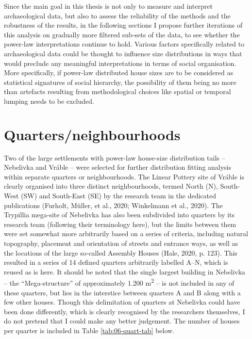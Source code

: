 \documentclass[
  12pt,
]{book}
\begin{document}
Since the main goal in this thesis is not only to measure and interpret archaeological data, but also to assess the reliability of the methods and the robustness of the results, in the following sections I propose further iterations of this analysis on gradually more filtered sub-sets of the data, to see whether the power-law interpretations continue to hold. Various factors specifically related to archaeological data could be thought to influence size distributions in ways that would preclude any meaningful interpretations in terms of social organisation. More specifically, if power-law distributed house sizes are to be considered as statistical signatures of social hierarchy, the possibility of them being no more than artefacts resulting from methodological choices like spatial or temporal lumping needs to be excluded.

\FloatBarrier

\hypertarget{quartersneighbourhoods}{%
\section{Quarters/neighbourhoods}\label{quartersneighbourhoods}}

Two of the large settlements with power-law house-size distribution tails -- Nebelivka and Vráble -- were selected for further distribution fitting analysis within separate quarters or neighbourhoods. The Linear Pottery site of Vráble is clearly organised into three distinct neighbourhoods, termed North (N), South-West (SW) and South-East (SE) by the research team in the dedicated publications (Furholt, Müller, et al., 2020; Winkelmann et al., 2020). The Trypillia mega-site of Nebelivka has also been subdivided into quarters by its research team (following their terminology here), but the limits between them were set somewhat more arbitrarily based on a series of criteria, including natural topography, placement and orientation of streets and entrance ways, as well as the locations of the large so-called Assembly Houses (Hale, 2020, p. 123). This resulted in a series of 14 defined quarters arbitrarily labelled A--N, which is reused as is here. It should be noted that the single largest building in Nebelivka -- the ``Mega-structure'' of approximately 1.200 m\textsuperscript{2} -- is not included in any of these quarters, but lies in the interstice between quarters A and B along with a few other houses. Though this delimitation of quarters at Nebelivka could have been done differently, which is clearly recognised by the researchers themselves, I do not pretend that I could make any better judgement. The number of houses per quarter is included in Table \ref{tab:06-quart-tab} below.
\end{document}
